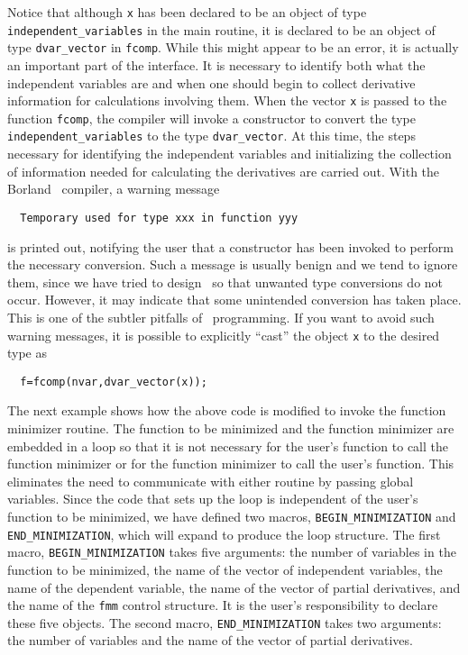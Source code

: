 \documentclass{admbmanual}
\begin{document}
Notice that although \texttt{x} has been declared to be an object of
type \texttt{independent\_variables} in the main routine, it is declared to
be an object of type \texttt{dvar\_vector} in \texttt{fcomp}. While this might
appear to be an error, it is actually an important part of the
interface. It is necessary to identify both what the
independent variables are and when one should begin to collect derivative
information for calculations involving them. When the vector
\texttt{x} is passed to the function \texttt{fcomp}, the compiler will
invoke a constructor to convert the type
\texttt{independent\_variables} to the type \texttt{dvar\_vector}.
At this time, the steps necessary for
identifying the independent variables and initializing the
collection of information needed for calculating the derivatives 
 are carried out. With the Borland \cplus\ compiler,
a warning message
\begin{lstlisting}
  Temporary used for type xxx in function yyy
\end{lstlisting}
\noindent is printed
out, notifying the user that a constructor has been invoked to perform
the necessary conversion. 
Such a message is usually benign and we tend to ignore them, since we
have tried to design \scAD\ so that unwanted type conversions do
not occur. However, it may indicate that some
unintended conversion has taken place. This is one of
the subtler pitfalls of \cplus\ programming. 
If you want to avoid such warning messages,
it is possible to explicitly ``cast'' the object \texttt{x} to the desired type
as
\begin{lstlisting}
  f=fcomp(nvar,dvar_vector(x));
\end{lstlisting}

The next example shows how the above code is modified to 
invoke the function minimizer routine. The function to
be minimized and the function minimizer are embedded in a loop
so that it is not necessary for the user's function to call the
function minimizer or for the function minimizer to call the
user's function. This eliminates the need to communicate with
either routine by passing global variables.  Since the code that sets up 
the loop is independent of the user's function to be minimized, we have
defined two macros, \texttt{BEGIN\_MINIMIZATION} and \texttt{END\_MINIMIZATION},
which will expand to produce the loop structure. The first macro, 
\texttt{BEGIN\_MINIMIZATION} takes five arguments: the number of variables 
in the function to be minimized, the name of the vector of independent 
variables, the name of the dependent variable, the name of the 
vector of partial derivatives, and the name of the \texttt{fmm} control structure.
 It is the user's
responsibility to declare these five objects.
The second macro, 
\texttt{END\_MINIMIZATION} takes two arguments: the number of variables and
the name of the vector of partial derivatives. 

\end{document}
